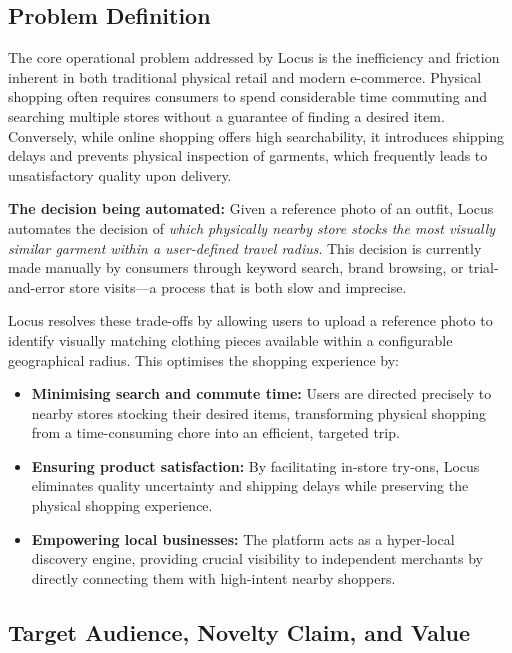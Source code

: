 \documentclass[12pt]{article}
\begin{document}
\subsection{Problem Definition}

The core operational problem addressed by Locus is the inefficiency and friction inherent in both traditional physical retail and modern e-commerce. Physical shopping often requires consumers to spend considerable time commuting and searching multiple stores without a guarantee of finding a desired item. Conversely, while online shopping offers high searchability, it introduces shipping delays and prevents physical inspection of garments, which frequently leads to unsatisfactory quality upon delivery.

\textbf{The decision being automated:} Given a reference photo of an outfit, Locus automates the decision of \emph{which physically nearby store stocks the most visually similar garment within a user-defined travel radius}. This decision is currently made manually by consumers through keyword search, brand browsing, or trial-and-error store visits---a process that is both slow and imprecise.

Locus resolves these trade-offs by allowing users to upload a reference photo to identify visually matching clothing pieces available within a configurable geographical radius. This optimises the shopping experience by:

\begin{itemize}
    \item \textbf{Minimising search and commute time:} Users are directed precisely to nearby stores stocking their desired items, transforming physical shopping from a time-consuming chore into an efficient, targeted trip.
    \item \textbf{Ensuring product satisfaction:} By facilitating in-store try-ons, Locus eliminates quality uncertainty and shipping delays while preserving the physical shopping experience.
    \item \textbf{Empowering local businesses:} The platform acts as a hyper-local discovery engine, providing crucial visibility to independent merchants by directly connecting them with high-intent nearby shoppers.
\end{itemize}

\subsection{Target Audience, Novelty Claim, and Value}
\label{sec:novelty}
\end{document}
